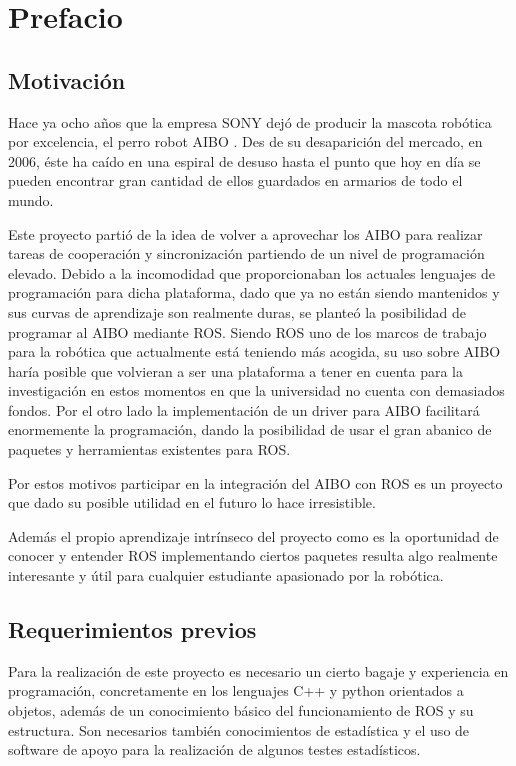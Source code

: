 \documentclass[12pt,a4paper,final,twoside]{book}
\begin{document}
\newpage
\thispagestyle{empty}
{}
\tableofcontents
\thispagestyle{fancy}
\newpage
{}
\listoffigures
\thispagestyle{fancy}
\newpage
{}
\listoftables
\thispagestyle{fancy}
\newpage


\chapter{Prefacio}
\thispagestyle{fancy}
\section{Motivación}
 
Hace ya ocho años que la empresa SONY dejó de producir la mascota robótica por excelencia, el perro robot AIBO \cite{aibo}. Des de su desaparición del mercado, en 2006, éste ha caído en una espiral de desuso hasta el punto que hoy en día se pueden encontrar gran cantidad de ellos guardados en armarios de todo el mundo.

Este proyecto partió de la idea de volver a aprovechar los AIBO para realizar tareas de cooperación y sincronización partiendo de un nivel de programación elevado. Debido a la incomodidad que proporcionaban los actuales lenguajes de programación para dicha plataforma, dado que ya no están siendo mantenidos y sus curvas de aprendizaje son realmente duras,   se planteó la posibilidad de programar al AIBO mediante ROS\cite{ros}.
Siendo ROS uno de los marcos de trabajo para la robótica que actualmente está teniendo más acogida, su uso sobre AIBO haría posible que volvieran a ser una plataforma a tener en cuenta para la investigación en estos momentos en que la universidad no cuenta con demasiados fondos. Por el otro lado la implementación de un driver para AIBO facilitará enormemente la programación, dando la posibilidad de usar el gran abanico de paquetes y herramientas existentes para ROS.

Por estos motivos participar en la integración del AIBO con ROS es un proyecto que dado su posible utilidad en el futuro lo hace irresistible.

Además el propio aprendizaje intrínseco del proyecto como es la oportunidad de conocer y entender ROS implementando ciertos paquetes resulta algo realmente interesante y útil para cualquier estudiante apasionado por la robótica.


\section{Requerimientos previos}
Para la realización de este proyecto es necesario un cierto bagaje y experiencia en programación, concretamente en los lenguajes C++ y python orientados a objetos, además de un conocimiento básico del funcionamiento de ROS y su estructura.
Son necesarios también conocimientos de estadística y el uso de software de apoyo para la realización de algunos testes estadísticos.
\newpage
\clearpage
\end{document}
